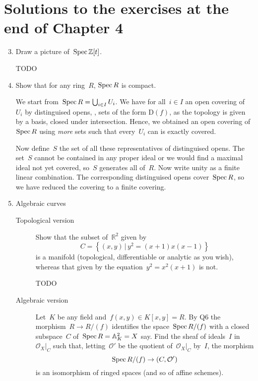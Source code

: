 \documentclass[a4paper,11pt,oneside,openany,article]{memoir}
\begin{document}
\chapter{Solutions to the exercises at the end of Chapter 4}
\begin{enumerate}
  \setcounter{enumi}{2}
  \item Draw a picture of~$\operatorname{Spec}\mathbb{Z}[t]$.

    \begin{solution}
      TODO
    \end{solution}

  \item Show that for any ring~$R$, $\operatorname{Spec} R$ is compact.

    \begin{solution}
      We start from~$\operatorname{Spec} R=\bigcup_{i\in I}U_i$. We have for all~$i\in I$ an open covering of~$U_i$ by distinguised opens, \ie, sets of the form $\mathrm{D}(f)$, as the topology is given by a basis, closed under intersection. Hence, we obtained an open covering of~$\operatorname{Spec} R$ using \emph{more} sets such that every~$U_i$ can is exactly covered.

      Now define~$S$ the set of all these representatives of distinguised opens. The set~$S$ cannot be contained in any proper ideal or we would find a maximal ideal not yet covered, so~$S$ generates all of~$R$. Now write unity as a finite linear combination. The corresponding distinguised opens cover~$\operatorname{Spec} R$, so we have reduced the covering to a finite covering.
    \end{solution}

  \setcounter{enumi}{8}
\item Algebraic curves
  \begin{description}
    \item[Topological version] Show that the subset of~$\mathbb{R}^2$ given by
      \begin{equation}
        C=\left\{ (x,y)\,|\,y^2=(x+1)x(x-1) \right\}
      \end{equation}
      is a manifold (topological, differentiable or analytic as you wish), whereas that given by the equation~$y^2=x^2(x+1)$ is not.

      \begin{solution}
        TODO
      \end{solution}

    \item[Algebraic version] Let~$K$ be any field and~$f(x,y)\in K[x,y]=R$. By Q6 the morphism~$R\to R/(f)$ identifies the space~$\operatorname{Spec} R/(f)$ with a closed subspace~$C$ of~$\operatorname{Spec} R=\mathbb{A}_K^2=X$ say. Find the sheaf of ideals~$I$ in~$\mathcal{O}_X|_C$ such that, letting~$\mathcal{O}'$ be the quotient of~$\mathcal{O}_X|_C$ by~$I$, the morphism
      \begin{equation}
        \operatorname{Spec} R/(f)\to(C,\mathcal{O}')
      \end{equation}
      is an isomorphism of ringed spaces (and so of affine schemes).


\end{description}
\end{enumerate}
\end{document}
